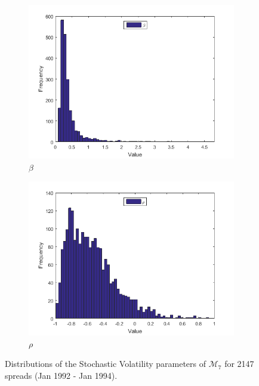 \documentclass[11pt,a4,twosided,singlespacing,titlepagenumber=on]{scrreprt}
\numberwithin{equation}{chapter} %
\theoremstyle{remark}
\begin{document}
\begin{figure}[H]
\begin{subfigure}[t]{0.32\textwidth}
        \includegraphics[width=1\textwidth]{res/params/731_1462/5}
        \caption{$\beta$}
    \end{subfigure}
    \begin{subfigure}[t]{0.32\textwidth}
        \centering
        \includegraphics[width=1\textwidth]{res/params/731_1462/6}
        \caption{$\rho$}
    \end{subfigure}
    \caption[]{Distributions of the Stochastic Volatility parameters of $\mathcal{M}_7$ for 2147 spreads (Jan 1992 - Jan 1994).}
    \label{fig:param_dists_1992_1994}
\end{figure}
% 
\end{document}
